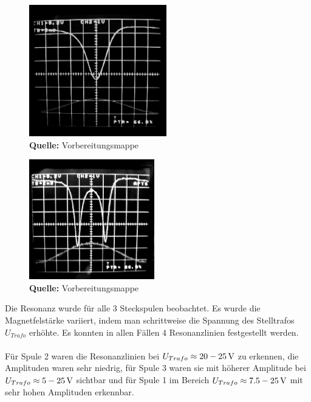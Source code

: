 \documentclass[a4paper,titlepage]{scrartcl}
\numberwithin{equation}{section}
\begin{document}
\begin{figure}[H]
\centering
\begin{minipage}{.4\textwidth}
	\centering
  	\includegraphics[width=.7\linewidth]{resonanz1.PNG}\\
  	\footnotesize\sffamily\textbf{Quelle:} Vorbereitungsmappe \cite{mappe}
    \captionsetup{width=0.8\textwidth}
  	\label{fig:resonanz1}
\end{minipage}%
\begin{minipage}{.4\textwidth}
	\centering
	\includegraphics[width=.7\linewidth]{resonanz2.PNG}\\
	\footnotesize\sffamily\textbf{Quelle:} Vorbereitungsmappe \cite{mappe}
	\captionsetup{width=0.8\textwidth}
	\label{fig:resonanz2}
\end{minipage}
\end{figure}
Die Resonanz wurde für alle 3 Steckspulen beobachtet. Es wurde die Magnetfelstärke variiert, indem man schrittweise die Spannung des Stelltrafos $U_{Trafo}$ erhöhte. Es konnten in allen Fällen 4 Resonanzlinien festgestellt werden.\\ \\
Für Spule 2 waren die Resonanzlinien bei $U_{Trafo}\approx \unit[20-25]{V}$ zu erkennen, die Amplituden waren sehr niedrig, für Spule 3 waren sie mit höherer Amplitude bei $U_{Trafo}\approx \unit[5-25]{V}$ sichtbar und für Spule 1 im Bereich $U_{Trafo}\approx \unit[7.5-25]{V}$ mit sehr hohen Amplituden erkennbar.
\end{document}
